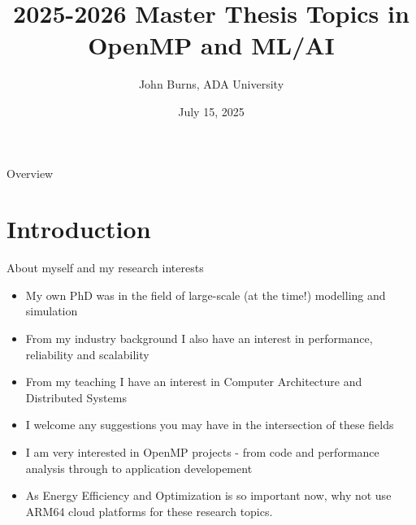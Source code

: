\documentclass[compress]{beamer}
\title{2025-2026 Master Thesis Topics in OpenMP and ML/AI}
\author{John Burns, ADA University}
\date{July 15, 2025}
\begin{document}
\begin{frame}
    \titlepage
\end{frame}

\begin{frame}{Overview}
    \tableofcontents
\end{frame}

\section{Introduction}
\begin{frame}{About myself and my research interests}
    \begin{itemize}
	\item My own PhD was in the field of large-scale (at the time!) modelling and simulation
        \item From my industry background I also have an interest in performance, reliability and scalability
        \item From my teaching I have an interest in Computer Architecture and Distributed Systems
        \item I welcome any suggestions you may have in the intersection of these fields
        \item I am very interested in OpenMP projects - from code and performance analysis through to application developement
	\item As Energy Efficiency and Optimization is so important now, why not use ARM64 cloud platforms for these research topics.
    \end{itemize}
\end{frame}

\end{document}
